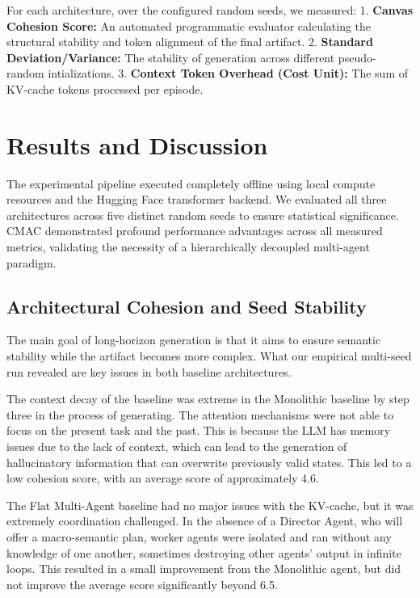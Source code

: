 \documentclass[pdflatex,sn-mathphys-num]{sn-jnl}
\begin{document}
For each architecture, over the configured random seeds, we measured:
1. \textbf{Canvas Cohesion Score:} An automated programmatic evaluator calculating the structural stability and token alignment of the final artifact.
2. \textbf{Standard Deviation/Variance:} The stability of generation across different pseudo-random intializations.
3. \textbf{Context Token Overhead (Cost Unit):} The sum of KV-cache tokens processed per episode.

\section{Results and Discussion}

The experimental pipeline executed completely offline using local compute resources and the Hugging Face transformer backend. We evaluated all three architectures across five distinct random seeds to ensure statistical significance. CMAC demonstrated profound performance advantages across all measured metrics, validating the necessity of a hierarchically decoupled multi-agent paradigm.

\subsection{Architectural Cohesion and Seed Stability}
The main goal of long-horizon generation is that it aims to ensure semantic stability while the artifact becomes more complex. What our empirical multi-seed run revealed are key issues in both baseline architectures. 

The context decay of the baseline was extreme in the Monolithic baseline by step three in the process of generating. The attention mechanisms were not able to focus on the present task and the past. This is because the LLM has memory issues due to the lack of context, which can lead to the generation of hallucinatory information that can overwrite previously valid states. This led to a low cohesion score, with an average score of approximately 4.6. 

The Flat Multi-Agent baseline had no major issues with the KV-cache, but it was extremely coordination challenged. In the absence of a Director Agent, who will offer a macro-semantic plan, worker agents were isolated and ran without any knowledge of one another, sometimes destroying other agents' output in infinite loops. This resulted in a small improvement from the Monolithic agent, but did not improve the average score significantly beyond 6.5.
\end{document}
